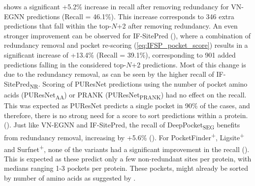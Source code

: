  shows a significant +5.2\% increase in recall after removing redundancy for VN-EGNN predictions (Recall = 46.1\%). This increase corresponds to 346 extra predictions that fall within the top-$N$+2 after removing redundancy. An even stronger improvement can be observed for IF-SitePred (), where a combination of redundancy removal and pocket re-scoring (\autoref{eq:IFSP_pocket_score}) results in a significant increase of +13.4\% (Recall = 39.1\%), corresponding to 901 added predictions falling in the considered top-$N$+2 predictions. Most of this change is due to the redundancy removal, as can be seen by the higher recall of IF-SitePred\textsubscript{NR}. Scoring of PUResNet predictions using the number of pocket amino acids (PUResNet\textsubscript{AA}) or PRANK (PUResNet\textsubscript{PRANK}) had no effect on the recall. This was expected as PUResNet predicts a single pocket in 90\% of the cases, and therefore, there is no strong need for a score to sort predictions within a protein. (). Just like VN-EGNN and IF-SitePred, the recall of DeepPocket\textsubscript{SEG} benefits from redundancy removal, increasing by +5.6\% (). For PocketFinder\textsuperscript{+}, Ligsite\textsuperscript{+} and Surfnet\textsuperscript{+}, none of the variants had a significant improvement in the recall (). This is expected as these predict only a few non-redundant sites per protein, with medians ranging 1-3 pockets per protein. These pockets, might already be sorted by number of amino acids as suggested by .

